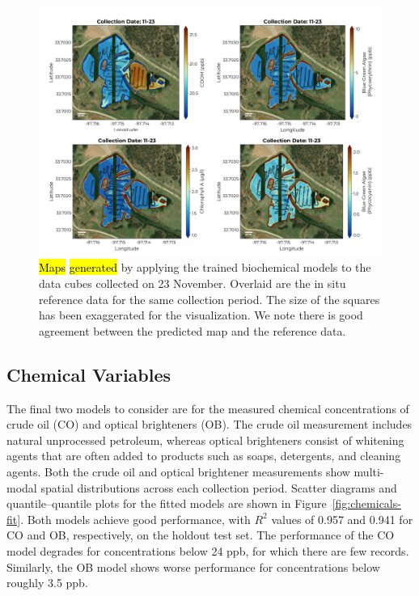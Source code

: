 \documentclass[remotesensing,article,accept,pdftex,moreauthors]{Definitions/mdpi}
\begin{document}
\vspace{-9pt}
\begin{figure}[H]

\vspace{-0.15in}
\hspace{-6pt}\includegraphics[width=0.92\columnwidth]{figures/results/maps/biochemical.pdf}
\vspace{-0.1in}
\caption{\hl{Maps} %
 \hl{generated} %
 by applying the trained biochemical models to the data cubes collected on 23 November. Overlaid are the in situ reference data for the same collection period. The size of the squares has been exaggerated for the visualization. We note there is good agreement between the predicted map and the reference data. \label{fig:map-biochem}}
\end{figure}  


 

\subsection{Chemical Variables}

The final two models to consider are for the measured chemical concentrations of crude oil (CO) and optical brighteners (OB). The crude oil measurement includes natural unprocessed petroleum, whereas optical brighteners consist of whitening agents that are often added to products such as soaps, detergents, and cleaning agents. Both the crude oil and optical brightener measurements show multi-modal spatial distributions across each collection period. Scatter diagrams and quantile--quantile plots for the fitted models are shown in Figure~\ref{fig:chemicals-fit}. Both models achieve good performance, with $R^2$ values of 0.957 and 0.941 for CO and OB, respectively, %
on the holdout test set. The performance of the CO model degrades for concentrations below 24 ppb, for which there are few records. Similarly, the OB model shows worse performance for concentrations below roughly 3.5 ppb.
\end{document}
